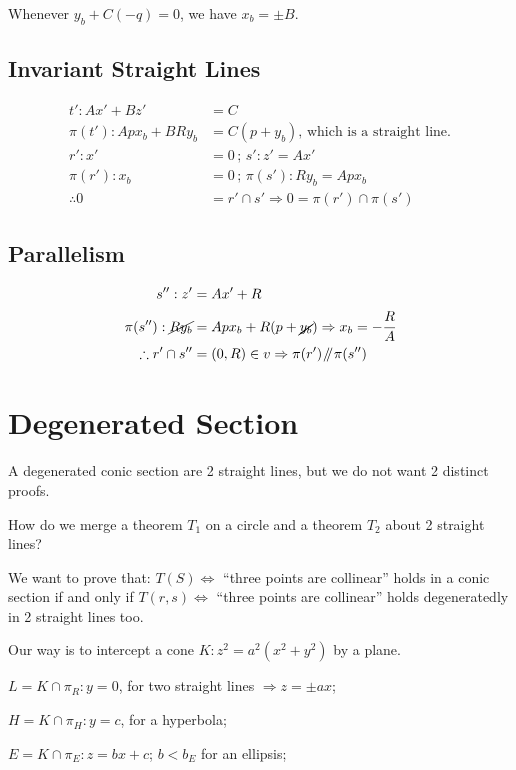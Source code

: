 \documentclass[12pt]{article}
\newcommand{\isParallel}{\mathbin{\!/\mkern-5mu/\!}}
\begin{document}
Whenever $y_b + C(-q) = 0$, we have $x_b = \pm B$.

\subsection{Invariant Straight Lines}

\begin{align}
t': Ax' + Bz' &= C \\
\pi(t'): A px_b + B R y_b &= C(p + y_b)\text{, which is a straight line.} \\
r': x' &= 0\,;\,s': z' = Ax' \\
\pi(r'): x_b &= 0\,;\,\pi(s'): Ry_b = Ap x_b\\ 
\therefore 0 &= r' \cap s' \Rightarrow 0 = \pi(r') \cap \pi(s')
\end{align}

\subsection{Parallelism}

\begin{align}
s'': z' &= Ax' + R \\
\pi(s''): \cancel{Ry_b} &= Ap x_b + R(p + \cancel{y_b}) \Rightarrow x_b = - \cfrac{R}{A} \\
\therefore r' \cap s'' &= (0,R) \in v \Rightarrow \pi(r') \isParallel \pi(s'')
\end{align}

\section{Degenerated Section}

A degenerated conic section are 2 straight lines, but we do not want 2 distinct proofs. 

How do we merge a theorem $T_1$ on a circle and a theorem $T_2$ about 2 straight lines?

We want to prove that: $T(S)\Leftrightarrow$ ``three points are collinear'' holds in a conic section if and only if $T(r,s)\Leftrightarrow$ ``three points are collinear'' holds degeneratedly in 2 straight lines too.

Our way is to intercept a cone $K:z^2 = a^2(x^2 + y^2)$ by a plane.

$L = K\cap \pi_R: y = 0$, for two straight lines $\Rightarrow z = \pm ax$;

$H = K\cap \pi_H: y = c$, for a hyperbola;

$E = K\cap \pi_E: z = bx + c$; $b < b_E$ for an ellipsis;
\end{document}
